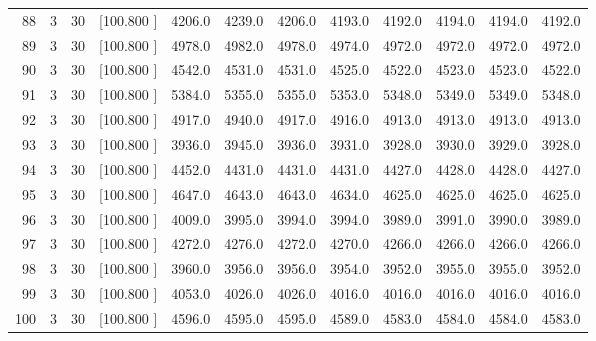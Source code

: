 \documentclass[12pt,a4paper]{article}
\begin{document}
\begin{center}
{\begin{tabular}{r r r r r r r r r r r r}
  88&  3& 30&[100.800   ]&  4206.0&  4239.0&  4206.0&  4193.0&  4192.0&  4194.0&  4194.0&  4192.0\\[-0.02in]
  89&  3& 30&[100.800   ]&  4978.0&  4982.0&  4978.0&  4974.0&  4972.0&  4972.0&  4972.0&  4972.0\\[-0.02in]
  90&  3& 30&[100.800   ]&  4542.0&  4531.0&  4531.0&  4525.0&  4522.0&  4523.0&  4523.0&  4522.0\\[-0.02in]
  91&  3& 30&[100.800   ]&  5384.0&  5355.0&  5355.0&  5353.0&  5348.0&  5349.0&  5349.0&  5348.0\\[-0.02in]
  92&  3& 30&[100.800   ]&  4917.0&  4940.0&  4917.0&  4916.0&  4913.0&  4913.0&  4913.0&  4913.0\\[-0.02in]
  93&  3& 30&[100.800   ]&  3936.0&  3945.0&  3936.0&  3931.0&  3928.0&  3930.0&  3929.0&  3928.0\\[-0.02in]
  94&  3& 30&[100.800   ]&  4452.0&  4431.0&  4431.0&  4431.0&  4427.0&  4428.0&  4428.0&  4427.0\\[-0.02in]
  95&  3& 30&[100.800   ]&  4647.0&  4643.0&  4643.0&  4634.0&  4625.0&  4625.0&  4625.0&  4625.0\\[-0.02in]
  96&  3& 30&[100.800   ]&  4009.0&  3995.0&  3994.0&  3994.0&  3989.0&  3991.0&  3990.0&  3989.0\\[-0.02in]
  97&  3& 30&[100.800   ]&  4272.0&  4276.0&  4272.0&  4270.0&  4266.0&  4266.0&  4266.0&  4266.0\\[-0.02in]
  98&  3& 30&[100.800   ]&  3960.0&  3956.0&  3956.0&  3954.0&  3952.0&  3955.0&  3955.0&  3952.0\\[-0.02in]
  99&  3& 30&[100.800   ]&  4053.0&  4026.0&  4026.0&  4016.0&  4016.0&  4016.0&  4016.0&  4016.0\\[-0.02in]
 100&  3& 30&[100.800   ]&  4596.0&  4595.0&  4595.0&  4589.0&  4583.0&  4584.0&  4584.0&  4583.0\\[-0.02in]

\hline
\end{tabular}}
\end{center}
\newpage
\end{document}
